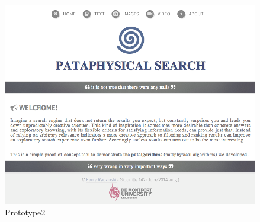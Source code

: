 \begin{figure}[htb] %
  \centering
  \includegraphics[width=\linewidth]{images/prototype02}
\caption[Prototype2]{Prototype2}
\label{fig:Prototype2}
\end{figure}

